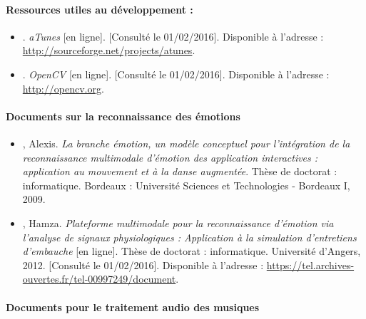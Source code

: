 \paragraph{Ressources utiles au développement :}

\begin{itemize}
	\item[\textbullet] . \textit{aTunes} [en ligne]. [Consulté le 01/02/2016]. Disponible à l'adresse : \url{http://sourceforge.net/projects/atunes}.
	\item[\textbullet] . \textit{OpenCV} [en ligne]. [Consulté le 01/02/2016]. Disponible à l'adresse : \url{http://opencv.org}.
\end{itemize}


\paragraph{Documents sur la reconnaissance des émotions}

\begin{itemize}
	\item[\textbullet] , Alexis. \textit{La branche émotion, un modèle conceptuel pour l'intégration de la reconnaissance multimodale d'émotion des application interactives : application au mouvement et à la danse augmentée}. Thèse de doctorat : informatique. Bordeaux : Université Sciences et Technologies - Bordeaux I, 2009.
	\item[\textbullet] , Hamza. \textit{Plateforme multimodale pour la reconnaissance d'émotion via l'analyse de signaux physiologiques : Application à la simulation d'entretiens d'embauche} [en ligne]. Thèse de doctorat : informatique. Université d'Angers, 2012. [Consulté le 01/02/2016]. Disponible à l'adresse : \url{https://tel.archives-ouvertes.fr/tel-00997249/document}.
\end{itemize}


\paragraph{Documents pour le traitement audio des musiques}

